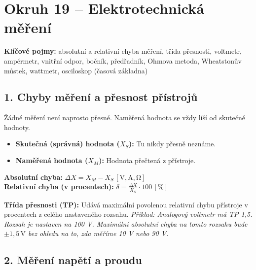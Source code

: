 \documentclass[a4paper,10pt]{article}
\newcommand{\jednotka}[1]{\,[\mathrm{#1}]}
\begin{document}
\section*{\large Okruh 19 – Elektrotechnická měření}

\begin{pojmybox}
\textbf{Klíčové pojmy:}
absolutní a relativní chyba měření, třída přesnosti, voltmetr, ampérmetr, vnitřní odpor, bočník, předřadník, Ohmova metoda, Wheatstonův můstek, wattmetr, osciloskop (časová základna)
\end{pojmybox}

\begin{vysvetlenibox}

\subsection*{1. Chyby měření a přesnost přístrojů}

Žádné měření není naprosto přesné. Naměřená hodnota se vždy líší od skutečné hodnoty.

\begin{itemize}
    \item \textbf{Skutečná (správná) hodnota ($X_S$):} Tu nikdy přesně neznáme.
    \item \textbf{Naměřená hodnota ($X_M$):} Hodnota přečtená z přístroje.
\end{itemize}

\begin{vzorcebox}
\textbf{Absolutní chyba:} $\Delta X = X_M - X_S \jednotka{V, A, \Omega}$ \\
\textbf{Relativní chyba (v procentech):} $\delta = \frac{\Delta X}{X_S} \cdot 100 \jednotka{\%}$
\end{vzorcebox}

\textbf{Třída přesnosti (TP):} Udává maximální povolenou relativní chybu přístroje v procentech z celého nastaveného rozsahu.
\textit{Příklad: Analogový voltmetr má TP 1,5. Rozsah je nastaven na 100 V. Maximální absolutní chyba na tomto rozsahu bude $\pm 1{,}5\,\mathrm{V}$ bez ohledu na to, zda měříme 10 V nebo 90 V.}

\subsection*{2. Měření napětí a proudu}


\end{vysvetlenibox}
\end{document}
